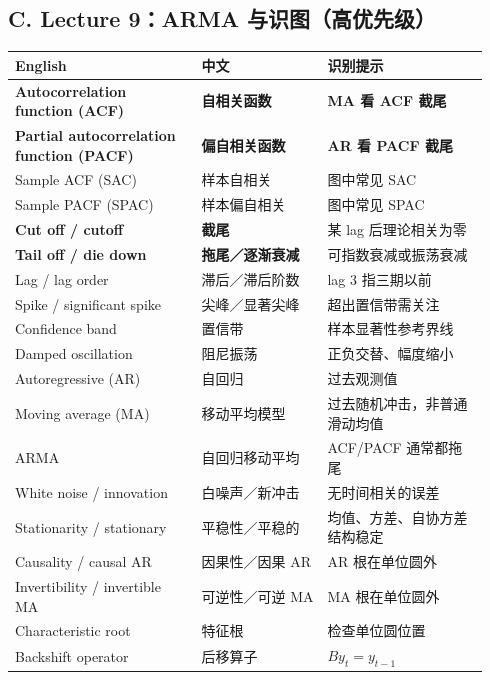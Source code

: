\documentclass[UTF8,fontset=fandol,10.5pt,a4paper]{ctexart}
\begin{document}
\subsection*{C. Lecture 9：ARMA 与识图（高优先级）}
\begin{longtable}{@{}p{0.37\linewidth}p{0.25\linewidth}p{0.32\linewidth}@{}}
\toprule English & 中文 & 识别提示\\\midrule\endhead
\textbf{Autocorrelation function (ACF)} & \textbf{自相关函数} & \textbf{MA 看 ACF 截尾}\\
\textbf{Partial autocorrelation function (PACF)} & \textbf{偏自相关函数} & \textbf{AR 看 PACF 截尾}\\
Sample ACF (SAC) & 样本自相关 & 图中常见 SAC\\
Sample PACF (SPAC) & 样本偏自相关 & 图中常见 SPAC\\
\textbf{Cut off / cutoff} & \textbf{截尾} & 某 lag 后理论相关为零\\
\textbf{Tail off / die down} & \textbf{拖尾／逐渐衰减} & 可指数衰减或振荡衰减\\
Lag / lag order & 滞后／滞后阶数 & lag 3 指三期以前\\
Spike / significant spike & 尖峰／显著尖峰 & 超出置信带需关注\\
Confidence band & 置信带 & 样本显著性参考界线\\
Damped oscillation & 阻尼振荡 & 正负交替、幅度缩小\\
Autoregressive (AR) & 自回归 & 过去观测值\\
Moving average (MA) & 移动平均模型 & 过去随机冲击，非普通滑动均值\\
ARMA & 自回归移动平均 & ACF/PACF 通常都拖尾\\
White noise / innovation & 白噪声／新冲击 & 无时间相关的误差\\
Stationarity / stationary & 平稳性／平稳的 & 均值、方差、自协方差结构稳定\\
Causality / causal AR & 因果性／因果 AR & AR 根在单位圆外\\
Invertibility / invertible MA & 可逆性／可逆 MA & MA 根在单位圆外\\
Characteristic root & 特征根 & 检查单位圆位置\\
Backshift operator & 后移算子 & $By_t=y_{t-1}$\\
\bottomrule
\end{longtable}
\end{document}
